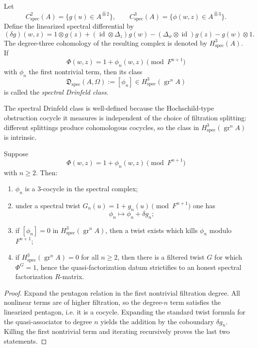 \begin{definition}
Let
\[
C^2_{\mathrm{spec}}(A)=\{g(u)\in A^{\widehat\otimes 2}\},
\qquad
C^3_{\mathrm{spec}}(A)=\{\phi(w,z)\in A^{\widehat\otimes 3}\}.
\]
Define the linearized spectral differential by
\[
(\delta g)(w,z)
=
1\otimes g(z)
+ (\operatorname{id}\otimes \Delta_z)g(w)
- (\Delta_w\otimes \operatorname{id})g(z)
- g(w)\otimes 1.
\]
The degree-three cohomology of the resulting complex is denoted by
$H^3_{\mathrm{spec}}(A)$.
If
\[
\Phi(w,z)=1+\phi_n(w,z)\pmod{F^{n+1}}
\]
with $\phi_n$ the first nontrivial term, then its class
\[
\mathfrak D_{\mathrm{spec}}(A,\Omega):=[\phi_n]
\in H^3_{\mathrm{spec}}(\operatorname{gr}^n A)
\]
is called the \emph{spectral Drinfeld class}.
\end{definition}

\begin{remark}
The spectral Drinfeld class is well-defined because the Hochschild-type
obstruction cocycle it measures is independent of the choice of
filtration splitting: different splittings produce cohomologous cocycles,
so the class in $H^3_{\mathrm{spec}}(\operatorname{gr}^n A)$ is intrinsic.
\end{remark}

\begin{theorem}
\label{thm:strictification-spectral-cohomology}
Suppose
\[
\Phi(w,z)=1+\phi_n(w,z)\pmod{F^{n+1}}
\]
with $n\ge 2$. Then:
\begin{enumerate}
\item $\phi_n$ is a $3$-cocycle in the spectral complex;
\item under a spectral twist $G_n(u)=1+g_n(u)\pmod{F^{n+1}}$ one has
 \[
 \phi_n\longmapsto \phi_n+\delta g_n;
 \]
\item if $[\phi_n]=0$ in
 $H^3_{\mathrm{spec}}(\operatorname{gr}^nA)$, then a twist exists which
 kills $\phi_n$ modulo $F^{n+1}$;
\item if $H^3_{\mathrm{spec}}(\operatorname{gr}^nA)=0$ for all $n\ge 2$,
 then there is a filtered twist $G$ for which $\Phi^G=1$, hence the
 quasi-factorization datum strictifies to an honest spectral
 factorization $R$-matrix.
\end{enumerate}
\end{theorem}

\begin{proof}
Expand the pentagon relation in the first nontrivial filtration degree.
All nonlinear terms are of higher filtration, so the degree-$n$ term
satisfies the linearized pentagon, i.e. it is a cocycle. Expanding the
standard twist formula for the quasi-associator to degree $n$ yields the
addition by the coboundary $\delta g_n$. Killing the first nontrivial
term and iterating recursively proves the last two statements.
\end{proof}

